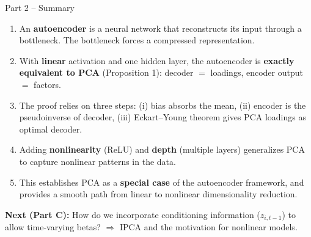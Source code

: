 \documentclass[aspectratio=169]{beamer}
\begin{document}
%
%
\begin{frame}{Part 2 -- Summary}

\begin{enumerate}
    \item An \textbf{autoencoder} is a neural network that reconstructs its input through a bottleneck. The bottleneck forces a compressed representation.
    
    \vspace{0.3em}
    \item With \textbf{linear} activation and one hidden layer, the autoencoder is \textbf{exactly equivalent to PCA} (Proposition 1): decoder $=$ loadings, encoder output $=$ factors.
    
    \vspace{0.3em}
    \item The proof relies on three steps: (i) bias absorbs the mean, (ii) encoder is the pseudoinverse of decoder, (iii) Eckart--Young theorem gives PCA loadings as optimal decoder.
    
    \vspace{0.3em}
    \item Adding \textbf{nonlinearity} (ReLU) and \textbf{depth} (multiple layers) generalizes PCA to capture nonlinear patterns in the data.
    
    \vspace{0.3em}
    \item This establishes PCA as a \textbf{special case} of the autoencoder framework, and provides a smooth path from linear to nonlinear dimensionality reduction.
\end{enumerate}

\vspace{0.5em}
\textbf{Next (Part C):} How do we incorporate conditioning information ($z_{i,t-1}$) to allow time-varying betas? $\Rightarrow$ IPCA and the motivation for nonlinear models.
\end{frame}
%
\end{document}
